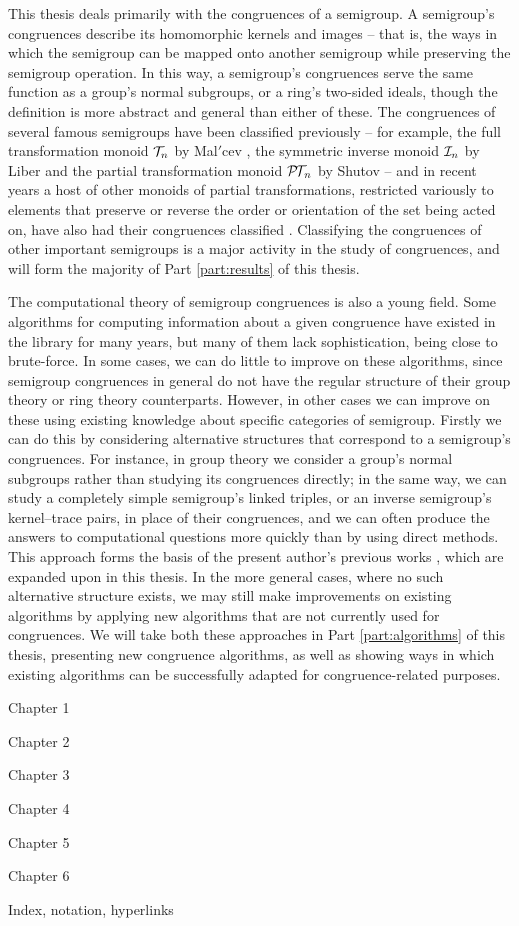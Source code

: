 This thesis deals primarily with the congruences of a semigroup.  A semigroup's
congruences describe its homomorphic kernels and images -- that is, the ways in
which the semigroup can be mapped onto another semigroup while preserving the
semigroup operation.  In this way, a semigroup's congruences serve the same
function as a group's normal subgroups, or a ring's two-sided ideals, though the
definition is more abstract and general than either of these.  The congruences
of several famous semigroups have been classified previously -- for example, the
full transformation monoid $\mathcal{T}_n$ by Mal$'$cev \cite{malcev_1952}, the symmetric
inverse monoid $\mathcal{I}_n$ by Liber \cite{liber_1953} and the partial transformation
monoid $\mathcal{P\!T\!}_n$ by Shutov \cite{shutov_1988} -- and in recent years a host of
other monoids of partial transformations, restricted variously to elements that
preserve or reverse the order or orientation of the set being acted on, have
also had their congruences classified \cite{fernandes_2000, lisbon_ii,
  lisbon_i}.  Classifying the congruences of other important semigroups is a
major activity in the study of congruences, and will form the majority of Part
\ref{part:results} of this thesis.

The computational theory of semigroup congruences is also a young field.  Some
algorithms for computing information about a given congruence have existed in
the \GAP{} library for many years, but many of them lack sophistication, being
close to brute-force.  In some cases, we can do little to improve on these
algorithms, since semigroup congruences in general do not have the regular
structure of their group theory or ring theory counterparts.  However, in other
cases we can improve on these using existing knowledge about specific categories
of semigroup.  Firstly we can do this by considering alternative structures that
correspond to a semigroup's congruences.  For instance, in group theory we
consider a group's normal subgroups rather than studying its congruences
directly; in the same way, we can study a completely simple semigroup's linked
triples, or an inverse semigroup's kernel--trace pairs, in place of their
congruences, and we can often produce the answers to computational questions
more quickly than by using direct methods.  This approach forms the basis of the
present author's previous works \cite{mtorpey_pre_msc, mtorpey_msc}, which are
expanded upon in this thesis. In the more general cases, where no such
alternative structure exists, we may still make improvements on existing
algorithms by applying new algorithms that are not currently used for
congruences.  We will take both these approaches in Part \ref{part:algorithms}
of this thesis, presenting new congruence algorithms, as well as showing ways in
which existing algorithms can be successfully adapted for congruence-related
purposes.

Chapter 1

Chapter 2

Chapter 3

Chapter 4

Chapter 5

Chapter 6

Index, notation, hyperlinks


